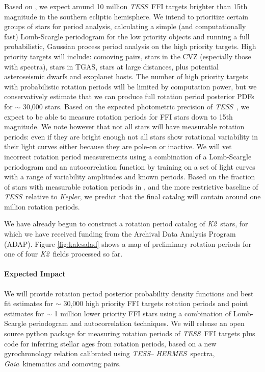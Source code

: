 \documentclass[letterpaper,12pt,preprint]{hack_aastex}
\newcommand{\Kepler}{{\it Kepler}}
\newcommand{\kepler}{\Kepler}
\newcommand{\Ktwo}{{\it K2}}
\newcommand{\ktwo}{\Ktwo}
\newcommand{\TESS}{{\it TESS}}
\newcommand{\tess}{{\it TESS}}
\newcommand{\Gaia}{{\it Gaia}}
\newcommand{\HERMES}{{\it HERMES}}
\begin{document}
Based on \citet{sullivan2015}, we expect around 10 million \TESS\ FFI
targets brighter than 15th magnitude in the southern ecliptic hemisphere.
We intend to prioritize certain groups of stars for period analysis,
calculating a simple (and computationally fast) Lomb-Scargle periodogram for
the low priority objects and running a full probabilistic, Gaussian process
period analysis on the high priority targets.
High priority targets will include: comoving pairs, stars in the CVZ
(especially those with spectra), stars in TGAS, stars at large distances, plus
potential asteroseismic dwarfs and exoplanet hosts.
The number of high priority targets with probabilistic rotation periods will
be limited by computation power, but we conservatively estimate that we can
produce full rotation period posterior PDFs for $\sim$ 30,000 stars.
Based on the expected photometric precision of \tess\ \citep{sullivan2015}, we
expect to be able to measure rotation periods for FFI stars down to 15th
magnitude.
We note however that not all stars will have measurable rotation periods:
even if they are bright enough not all stars show rotational variability in
their light curves either because they are pole-on or inactive.
We will vet incorrect rotation period measurements using a combination of a
Lomb-Scargle periodogram and an autocorrelation function by
training on a set of light curves with a range of variability amplitudes and
known periods.
Based on the fraction of stars with measurable rotation periods in
\citet{mcquillan2014}, and the more restrictive baseline of \tess\ relative to
\kepler, we predict that the final catalog will contain around one million
rotation periods.

We have already begun to construct a rotation period catalog of \ktwo\ stars,
for which we have received funding from the Archival Data Analysis Program
(ADAP).
Figure \ref{fig:kalesalad} shows a map of preliminary rotation periods for one
of four \ktwo\ fields processed so far.


\paragraph{Expected Impact}
We will provide rotation period posterior probability density functions and
best fit estimates for $\sim$ 30,000 high priority FFI targets rotation
periods and point estimates for $\sim$ 1 million lower priority FFI stars
using a combination of Lomb-Scargle periodogram and autocorrelation
techniques.
We will release an open source python package for measuring rotation periods
of \tess\ FFI targets plus code for inferring stellar ages from rotation
periods, based on a new gyrochronology relation calibrated using \TESS--
\HERMES\ spectra, \Gaia\ kinematics and comoving pairs.
\end{document}
